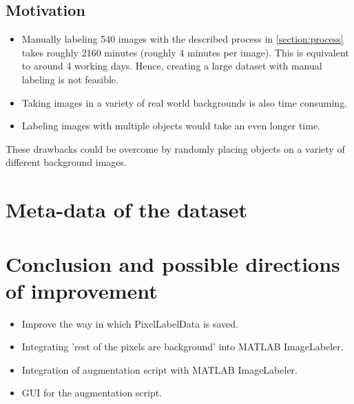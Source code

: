 \documentclass[paper=a4,11pt,parskip=half,toc=listof]{scrartcl}
\begin{document}
\subsection{Motivation}
	\begin{itemize}
		\item Manually labeling 540 images with the described process in \ref{section:process} takes roughly 2160 minutes (roughly 4 minutes per image). This is equivalent to around 4 working days. Hence, creating a large dataset with manual labeling is not feasible.
		\item Taking images in a variety of real world backgrounds is also time consuming.
		\item Labeling images with multiple objects would take an even longer time.
	\end{itemize}
	
These drawbacks could be overcome by randomly placing objects on a variety of different background images.



\section{Meta-data of the dataset}



\section{Conclusion and possible directions of improvement}
	\begin{itemize}
		\item Improve the way in which PixelLabelData is saved.
		\item Integrating 'rest of the pixels are background' into MATLAB ImageLabeler.
		\item Integration of augmentation script with MATLAB ImageLabeler.
		\item GUI for the augmentation script.
	\end{itemize}

\newpage
{}
\begin{thebibliography}{9}

\end{thebibliography}
\end{document}
